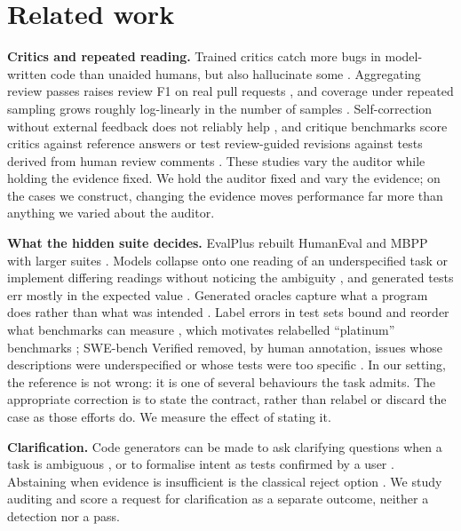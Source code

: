 \section{Related work}
\label{sec:related}

\textbf{Critics and repeated reading.} Trained critics catch more bugs in model-written code than unaided humans,
but also hallucinate some \citep{mcaleese2024critics}. Aggregating review passes raises review F1 on real pull
requests \citep{zeng2025swrbench}, and coverage under repeated sampling grows roughly log-linearly in the number
of samples \citep{brown2024monkeys}. Self-correction without external feedback does not reliably help
\citep{huang2024selfcorrect}, and critique benchmarks score critics against reference answers \citep{lin2024criticbench} or test review-guided revisions
against tests derived from human review comments \citep{zhang2026ccrab}. These studies vary the auditor while holding the evidence fixed. We hold the auditor fixed
and vary the evidence; on the cases we construct, changing the evidence moves performance far more than anything we
varied about the auditor.

\textbf{What the hidden suite decides.} EvalPlus rebuilt HumanEval and MBPP with larger suites
\citep{liu2023evalplus}. Models collapse onto one reading of an underspecified task or implement differing readings without noticing
the ambiguity \citep{richter2026collapse, yang2026orchid}, and generated tests err mostly in the expected value \citep{xiong2023testing}. Generated oracles capture what a
program does rather than what was intended \citep{konstantinou2024oracles}. Label errors in test sets bound and
reorder what benchmarks can measure \citep{northcutt2021labelerrors, gema2025mmlu}, which motivates relabelled
``platinum'' benchmarks \citep{vendrow2025platinum}; SWE-bench Verified removed, by human annotation, issues whose
descriptions were underspecified or whose tests were too specific \citep{openai2024swebenchverified}. In our setting, the reference
is not wrong: it is one of several behaviours the task admits. The appropriate correction is to state the
contract, rather than relabel or discard the case as those efforts do. We measure the effect of stating it.

\textbf{Clarification.} Code generators can be made to ask clarifying questions when a task is ambiguous
\citep{mu2024clarifygpt, wu2025humanevalcomm, li2026clareval, fang2026clarifycodebench}, or to formalise intent as tests confirmed by a user
\citep{lahiri2022ticoder}. Abstaining when evidence is insufficient is the classical reject option
\citep{chow1970reject}. We study auditing and score a request for clarification as a separate outcome,
neither a detection nor a pass.

